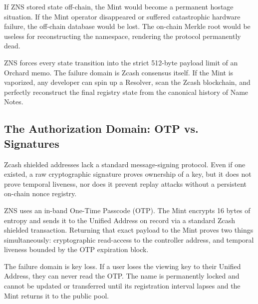 If ZNS stored state off-chain, the Mint would become a permanent hostage situation. If the Mint operator disappeared or suffered catastrophic hardware failure, the off-chain database would be lost. The on-chain Merkle root would be useless for reconstructing the namespace, rendering the protocol permanently dead.

ZNS forces every state transition into the strict 512-byte payload limit of an Orchard memo. The failure domain is Zcash consensus itself. If the Mint is vaporized, any developer can spin up a Resolver, scan the Zcash blockchain, and perfectly reconstruct the final registry state from the canonical history of Name Notes.

\subsection{The Authorization Domain: OTP vs. Signatures}

Zcash shielded addresses lack a standard message-signing protocol. Even if one existed, a raw cryptographic signature proves ownership of a key, but it does not prove temporal liveness, nor does it prevent replay attacks without a persistent on-chain nonce registry.

ZNS uses an in-band One-Time Passcode (OTP). The Mint encrypts 16 bytes of entropy and sends it to the Unified Address on record via a standard Zcash shielded transaction. Returning that exact payload to the Mint proves two things simultaneously: cryptographic read-access to the controller address, and temporal liveness bounded by the OTP expiration block.

The failure domain is key loss. If a user loses the viewing key to their Unified Address, they can never read the OTP. The name is permanently locked and cannot be updated or transferred until its registration interval lapses and the Mint returns it to the public pool.